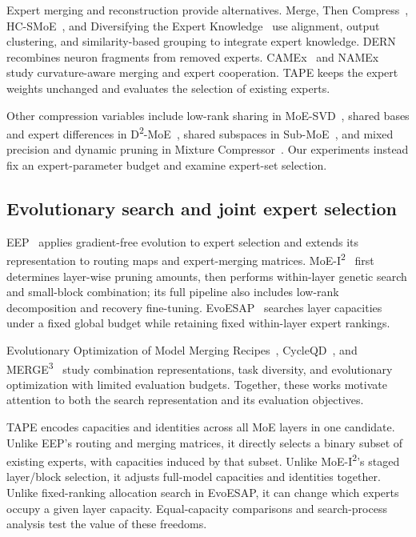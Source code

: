 \documentclass{article}
\begin{document}
Expert merging and reconstruction provide alternatives. Merge, Then Compress~\citep{ref5}, HC-SMoE~\citep{ref6}, and Diversifying the Expert Knowledge~\citep{ref7} use alignment, output clustering, and similarity-based grouping to integrate expert knowledge. DERN~\citep{ref8} recombines neuron fragments from removed experts. CAMEx~\citep{ref9} and NAMEx~\citep{ref10} study curvature-aware merging and expert cooperation. TAPE keeps the expert weights unchanged and evaluates the selection of existing experts.

Other compression variables include low-rank sharing in MoE-SVD~\citep{ref11}, shared bases and expert differences in D\textsuperscript{2}-MoE~\citep{ref12}, shared subspaces in Sub-MoE~\citep{ref13}, and mixed precision and dynamic pruning in Mixture Compressor~\citep{ref14}. Our experiments instead fix an expert-parameter budget and examine expert-set selection.

\subsection{Evolutionary search and joint expert selection}
\label{sec:2.2}
EEP~\citep{ref15} applies gradient-free evolution to expert selection and extends its representation to routing maps and expert-merging matrices. MoE-I\textsuperscript{2}~\citep{ref16} first determines layer-wise pruning amounts, then performs within-layer genetic search and small-block combination; its full pipeline also includes low-rank decomposition and recovery fine-tuning. EvoESAP~\citep{ref17} searches layer capacities under a fixed global budget while retaining fixed within-layer expert rankings.

Evolutionary Optimization of Model Merging Recipes~\citep{ref18}, CycleQD~\citep{ref19}, and MERGE\textsuperscript{3}~\citep{ref20} study combination representations, task diversity, and evolutionary optimization with limited evaluation budgets. Together, these works motivate attention to both the search representation and its evaluation objectives.

TAPE encodes capacities and identities across all MoE layers in one candidate. Unlike EEP's routing and merging matrices, it directly selects a binary subset of existing experts, with capacities induced by that subset. Unlike MoE-I\textsuperscript{2}'s staged layer/block selection, it adjusts full-model capacities and identities together. Unlike fixed-ranking allocation search in EvoESAP, it can change which experts occupy a given layer capacity. Equal-capacity comparisons and search-process analysis test the value of these freedoms.
\end{document}
